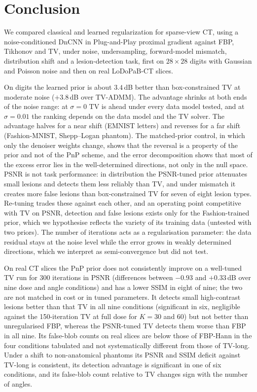 \section{Conclusion}
\label{sec:conclusion}

We compared classical and learned regularization for sparse-view CT, using a noise-conditioned DnCNN in Plug-and-Play proximal gradient against FBP, Tikhonov and TV, under noise, undersampling, forward-model mismatch, distribution shift and a lesion-detection task, first on $28\times28$ digits with Gaussian and Poisson noise and then on real LoDoPaB-CT slices.

On digits the learned prior is about $3.4$\,dB better than box-constrained TV at moderate noise ($+3.8$\,dB over TV-ADMM). The advantage shrinks at both ends of the noise range: at $\sigma=0$ TV is ahead under every data model tested, and at $\sigma=0.01$ the ranking depends on the data model and the TV solver. The advantage halves for a near shift (EMNIST letters) and reverses for a far shift (Fashion-MNIST, Shepp--Logan phantom). The matched-prior control, in which only the denoiser weights change, shows that the reversal is a property of the prior and not of the PnP scheme, and the error decomposition shows that most of the excess error lies in the well-determined directions, not only in the null space.
PSNR is not task performance: in distribution the PSNR-tuned prior attenuates small lesions and detects them less reliably than TV, and under mismatch it creates more false lesions than box-constrained TV for seven of eight lesion types. Re-tuning trades these against each other, and an operating point competitive with TV on PSNR, detection and false lesions exists only for the Fashion-trained prior, which we hypothesise reflects the variety of its training data (untested with two priors).
The number of iterations acts as a regularisation parameter: the data residual stays at the noise level while the error grows in weakly determined directions, which we interpret as semi-convergence but did not test.

On real CT slices the PnP prior does not consistently improve on a well-tuned TV run for 300 iterations in PSNR (differences between $-0.93$ and $+0.33$\,dB over nine dose and angle conditions) and has a lower SSIM in eight of nine; the two are not matched in cost or in tuned parameters. It detects small high-contrast lesions better than that TV in all nine conditions (significant in six, negligible against the 150-iteration TV at full dose for $K=30$ and $60$) but not better than unregularised FBP, whereas the PSNR-tuned TV detects them worse than FBP in all nine. Its false-blob counts on real slices are below those of FBP-Hann in the four conditions tabulated and not systematically different from those of TV-long. Under a shift to non-anatomical phantoms its PSNR and SSIM deficit against TV-long is consistent, its detection advantage is significant in one of six conditions, and its false-blob count relative to TV changes sign with the number of angles.


